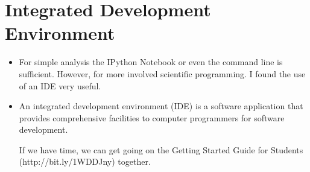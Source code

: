 \documentclass[a4paper,12pt,bold,leqno,fleqn,]{scrartcl}
\begin{document}
\section{Integrated Development Environment}
\begin{itemize}
\item For simple analysis the IPython Notebook or even the command line is sufficient. However, for more involved scientific programming. I found the use of an IDE very useful.
\item An integrated development environment (IDE) is a software application that provides comprehensive facilities to computer programmers for software development.

If we have time, we can get going on the Getting Started Guide for Students (http://bit.ly/1WDDJny) together. 
\end{itemize}




\end{document}
